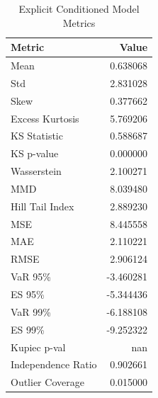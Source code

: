 \begin{table}[htbp]
\centering
\begin{tabular}{lr}
\hline
\textbf{Metric} & \textbf{Value} \\
\hline
Mean & 0.638068 \\
Std & 2.831028 \\
Skew & 0.377662 \\
Excess Kurtosis & 5.769206 \\
\hline
KS Statistic & 0.588687 \\
KS p-value & 0.000000 \\
Wasserstein & 2.100271 \\
MMD & 8.039480 \\
Hill Tail Index & 2.889230 \\
\hline
MSE & 8.445558 \\
MAE & 2.110221 \\
RMSE & 2.906124 \\
\hline
VaR 95\% & -3.460281 \\
ES 95\% & -5.344436 \\
VaR 99\% & -6.188108 \\
ES 99\% & -9.252322 \\
Kupiec p-val & nan \\
Independence Ratio & 0.902661 \\
Outlier Coverage & 0.015000 \\
\hline
\end{tabular}
\caption{Explicit Conditioned Model Metrics}
\label{tab:explicit_conditioned_metrics}
\end{table}
